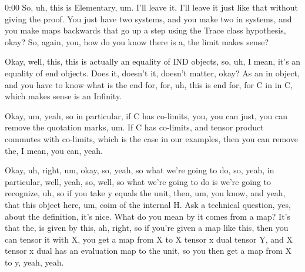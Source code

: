 \begin{unfinished}{0:00}
So, uh, this is Elementary, um. I'll leave it, I'll leave it just like that without giving the proof. You just have two systems, and you make two in systems, and you make maps backwards that go up a step using the Trace class hypothesis, okay? So, again, you, how do you know there is a, the limit makes sense?

Okay, well, this, this is actually an equality of IND objects, so, uh, I mean, it's an equality of end objects. Does it, doesn't it, doesn't matter, okay? As an in object, and you have to know what is the end for, for, uh, this is end for, for C in in C, which makes sense is an Infinity.

Okay, um, yeah, so in particular, if C has co-limits, you, you can just, you can remove the quotation marks, um. If C has co-limits, and tensor product commutes with co-limits, which is the case in our examples, then you can remove the, I mean, you can, yeah.

Okay, uh, right, um, okay, so, yeah, so what we're going to do, so, yeah, in particular, well, yeah, so, well, so what we're going to do is we're going to recognize, uh, so if you take y equals the unit, then, um, you know, and yeah, that this object here, um, coim of the internal H. Ask a technical question, yes, about the definition, it's nice. What do you mean by it comes from a map? It's that the, is given by this, ah, right, so if you're given a map like this, then you can tensor it with X, you get a map from X to X tensor x dual tensor Y, and X tensor x dual has an evaluation map to the unit, so you then get a map from X to y, yeah, yeah.


\end{unfinished}
